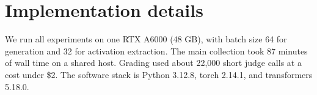 \section{Implementation details}
\label{app:impl}

We run all experiments on one RTX A6000 (48 GB), with batch size 64 for generation and 32 for activation extraction.
The main collection took 87 minutes of wall time on a shared host.
Grading used about 22,000 short judge calls at a cost under \$2.
The software stack is Python 3.12.8, torch 2.14.1, and transformers 5.18.0.
